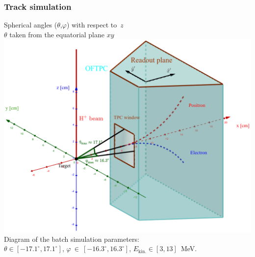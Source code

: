 \documentclass{beamer}
\begin{document}
	\begin{frame}
		\frametitle{Track simulation}
		\centering
		\large{Spherical angles ($\theta$,$\varphi$) with respect to~$z$}\\
		\small{$\theta$ taken from the equatorial plane $xy$}
		\centering
		\textcolor{white}{aaaaaaaa}\includegraphics[height= 0.61 \textheight]{../images/tpc_micro_simulation.png}\newline
		\small{Diagram of the batch simulation parameters:\\ $\theta\in[-17.1^\circ,17.1^\circ]$, $\varphi~\in~[-16.3^\circ,16.3^\circ]$, $ E_\text{kin.} \in [3,13] $~MeV.}
	\end{frame}
	
\end{document}
